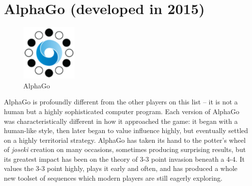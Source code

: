\documentclass[a5paper,12pt,twoside]{book} %
\newcounter{joseki}                 %
\begin{document}
\section*{AlphaGo (developed in 2015)}

\begin{figure}
\centering
\includegraphics[width=0.25\textwidth]{AlphaGo.eps}
\caption*{\label{fig:AlphaGo}AlphaGo}
\end{figure}

AlphaGo is profoundly different from the other players on this list – it is not a human but a highly sophisticated computer program. Each version of AlphaGo was characteristically different in how it approached the game: it began with a human-like style, then later began to value influence highly, but eventually settled on a highly territorial strategy. AlphaGo has taken its hand to the potter's wheel of \textit{joseki} creation on many occasions, sometimes producing surprising results, but its greatest impact has been on the theory of 3-3 point invasion beneath a 4-4. It values the 3-3 point highly, plays it early and often, and has produced a whole new toolset of sequences which modern players are still eagerly exploring.\\
\end{document}
